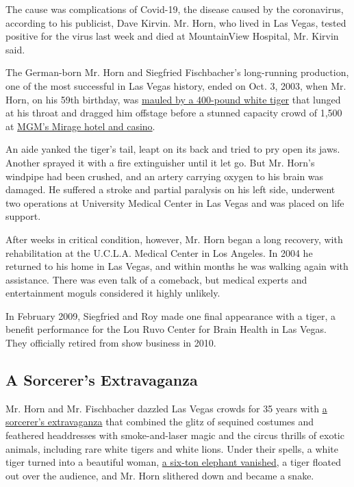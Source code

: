 The cause was complications of Covid-19, the disease caused by the
coronavirus, according to his publicist, Dave Kirvin. Mr. Horn, who
lived in Las Vegas, tested positive for the virus last week and died at
MountainView Hospital, Mr. Kirvin said.

The German-born Mr. Horn and Siegfried Fischbacher's long-running
production, one of the most successful in Las Vegas history, ended on
Oct. 3, 2003, when Mr. Horn, on his 59th birthday, was
\href{https://www.nytimes3xbfgragh.onion/2003/10/06/us/onstage-attack-casts-pall-over-las-vegas-strip.html}{mauled
by a 400-pound white tiger} that lunged at his throat and dragged him
offstage before a stunned capacity crowd of 1,500 at
\href{https://mirage.mgmresorts.com/en.html}{MGM's Mirage hotel and
casino}.

An aide yanked the tiger's tail, leapt on its back and tried to pry open
its jaws. Another sprayed it with a fire extinguisher until it let go.
But Mr. Horn's windpipe had been crushed, and an artery carrying oxygen
to his brain was damaged. He suffered a stroke and partial paralysis on
his left side, underwent two operations at University Medical Center in
Las Vegas and was placed on life support.

After weeks in critical condition, however, Mr. Horn began a long
recovery, with rehabilitation at the U.C.L.A. Medical Center in Los
Angeles. In 2004 he returned to his home in Las Vegas, and within months
he was walking again with assistance. There was even talk of a comeback,
but medical experts and entertainment moguls considered it highly
unlikely.

In February 2009, Siegfried and Roy made one final appearance with a
tiger, a benefit performance for the Lou Ruvo Center for Brain Health in
Las Vegas. They officially retired from show business in 2010.

\hypertarget{a-sorcerers-extravaganza}{%
\subsection{A Sorcerer's Extravaganza}\label{a-sorcerers-extravaganza}}

Mr. Horn and Mr. Fischbacher dazzled Las Vegas crowds for 35 years with
\href{https://www.youtube.com/watch?v=jun11ng8WaM}{a sorcerer's
extravaganza} that combined the glitz of sequined costumes and feathered
headdresses with smoke-and-laser magic and the circus thrills of exotic
animals, including rare white tigers and white lions. Under their
spells, a white tiger turned into a beautiful woman,
\href{https://www.youtube.com/watch?v=Vk48Dry8KzY}{a six-ton elephant
vanished}, a tiger floated out over the audience, and Mr. Horn slithered
down and became a snake.

